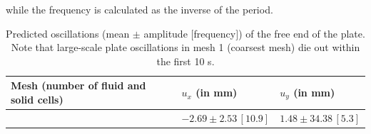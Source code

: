 \documentclass[sn-mathphys,Numbered]{sn-jnl}%
\begin{document}
while the frequency is calculated as the inverse of the period.
\begin{table}[htb]
	\centering
		\begin{tabular}{lll}
			\hline
			Mesh (number of fluid and solid cells) & $u_x$ (in mm) & $u_y$ (in mm) \\
			\hline
			
			\citet{Turek2006} & $-2.69 \pm 2.53\,[10.9]$ & $1.48 \pm 34.38\,[5.3]$ \\
			\hline
		\end{tabular}
	\caption{Predicted oscillations (mean $\pm$ amplitude $[$frequency$]$) of the free end of the plate. Note that large-scale plate oscillations in mesh 1 (coarsest mesh) die out within the first 10 s.}
		\label{tab:hronTurekDisp}
\end{table}


\end{document}
